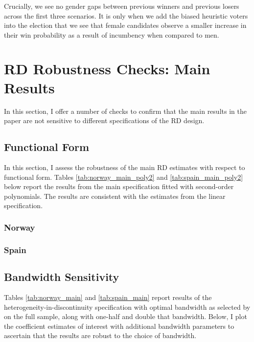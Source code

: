\documentclass[12pt]{article}
\begin{document}
Crucially, we see no gender gaps between previous winners and previous losers across the first three scenarios. It is only when we add the biased heuristic voters into the election that we see that female candidates observe a smaller increase in their win probability as a result of incumbency when compared to men.


\pagebreak
\section{RD Robustness Checks: Main Results}

In this section, I offer a number of checks to confirm that the main results in the paper are not sensitive to different specifications of the RD design.

\subsection{Functional Form}
\label{app:rd_polynomial}

In this section, I assess the robustness of the main RD estimates with respect to functional form. Tables \ref{tab:norway_main_poly2} and \ref{tab:spain_main_poly2} below report the results from the main specification fitted with second-order polynomials. The results are consistent with the estimates from the linear specification.

\subsubsection{Norway}



\clearpage
\subsubsection{Spain}



\clearpage
\subsection{Bandwidth Sensitivity}
\label{app:bandwidth_sensitivity}

Tables \ref{tab:norway_main} and \ref{tab:spain_main} report results of the heterogeneity-in-discontinuity specification with optimal bandwidth as selected by \citet{calonico2014} on the full sample, along with one-half and double that bandwidth. Below, I plot the coefficient estimates of interest with additional bandwidth parameters to ascertain that the results are robust to the choice of bandwidth.
\end{document}
